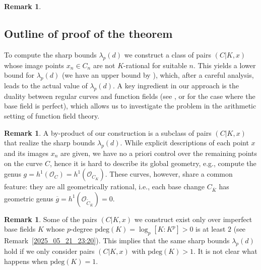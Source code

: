 \documentclass[12pt,reqno]{amsart}%
\theoremstyle{definition}
\newtheorem{rem}[prop]{Remark}
\theoremstyle{remark}
\newcommand{\ov}{\overline}
\newcommand{\OO}{\mathcal{O}}
\newcommand{\de}{\delta}
\newcommand{\lam}{\lambda}
\begin{document}
\begin{rem}
\end{rem}

\subsection{Outline of proof of the theorem}
To compute the sharp bounds $\lam_p(d)$ we construct a class of pairs $(C|K,x)$ whose image points $x_n \in C_n$ are not $K$-rational for suitable $n$.
This yields a lower bound for $\lam_p(d)$ (we have an upper bound by \cite[Theorem~1.1]{HiSt22}), which, after a careful analysis, leads to the actual value of $\lam_p(d)$.
A key ingredient in our approach is the duality between regular curves and function fields
(see \cite[7.4]{EGA2}, or \cite[II.2.5]{Sil09} for the case where the base field is perfect),
which allows us to investigate the problem in the arithmetic setting of function field theory.

\begin{rem}\label{2026_05_18_18:30}
A by-product of our construction is a subclass of pairs $(C|K,x)$ that realize the sharp bounds $\lam_p(d)$.
While explicit descriptions of each point $x$ and its images $x_n$ are given, we have no a priori control over the remaining points on the curve $C$, hence it is hard to describe its global geometry, e.g., compute the genus $g=h^1(\OO_C)=h^1(\OO_{C_{\ov K}})$.
These curves, however, share a common feature: they are all geometrically rational, i.e., each base change $C_{\ov K}$ has geometric genus $\ov g=h^1(\OO_{\tilde C_{\ov K}})=0$.
\end{rem}



\begin{rem}\label{2026_05_18_17:45}
Some of the pairs $(C|K,x)$ we construct exist only over imperfect base fields $K$ whose $p$-degree $\mathrm{pdeg}(K) = \log_p [K:K^p]>0$ is at least $2$ (see Remark~\ref{2025_05_21_23:20}).
This implies that the same sharp bounds $\lam_p(d)$ hold if we only consider pairs $(C|K,x)$ with $\mathrm{pdeg}(K)>1$. It is not clear what happens when $\mathrm{pdeg}(K)=1$.
\end{rem}
\end{document}
